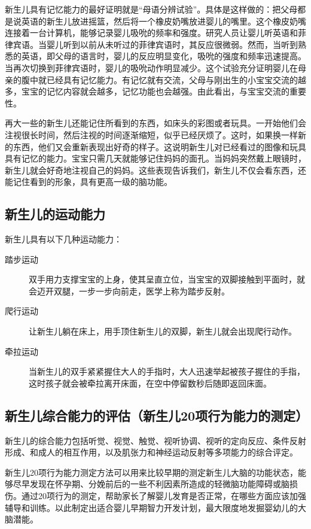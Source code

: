 新生儿具有记忆能力的最好证明就是``母语分辨试验''。具体是这样做的：把父母都是说英语的新生儿放进摇篮，然后将一个橡皮奶嘴放进婴儿的嘴里。这个橡皮奶嘴连接着一台计算机，能够记录婴儿吸吮的频率和强度。研究人员让婴儿听英语和菲律宾语。当婴儿听到以前从未听过的菲律宾语时，其反应很微弱。然而，当听到熟悉的英语，即父母的语言时，婴儿的反应明显变化，吸吮的强度和频率迅速提高。当再次切换到菲律宾语时，婴儿的吸吮动作明显减少。这个试验充分证明婴儿在母亲的腹中就已经具有记忆能力。有记忆就有交流，父母与刚出生的小宝宝交流的越多，宝宝的记忆内容就会越多，记忆功能也会越强。由此看出，与宝宝交流的重要性。

再大一些的新生儿还能记住所看到的东西，如床头的彩图或者玩具。一开始他们会注视很长时间，然后注视的时间逐渐缩短，似乎已经厌烦了。这时，如果换一样新的东西，他们又会重新表现出好奇的样子。这说明新生儿对已经看过的图像和玩具具有记忆的能力。宝宝只需几天就能够记住妈妈的面孔。当妈妈突然戴上眼镜时，新生儿就会好奇地注视自己的妈妈。这些表现告诉我们，新生儿不仅会看东西，还能记住看到的形象，具有更高一级的脑功能。


\subsection{新生儿的运动能力}%

新生儿具有以下几种运动能力：

\begin{description}
\item
[踏步运动]双手用力支撑宝宝的上身，使其呈直立位，当宝宝的双脚接触到平面时，就会迈开双腿，一步一步向前走，医学上称为踏步反射。
\item
[爬行运动]让新生儿躺在床上，用手顶住新生儿的双脚，新生儿就会出现爬行动作。
\item
[牵拉运动]当新生儿的双手紧紧握住大人的手指时，大人迅速举起被孩子握住的手指，这时孩子就会被牵拉离开床面，在空中停留数秒后随即返回床面。
\end{description}

\subsection{新生儿综合能力的评估（新生儿20项行为能力的测定）}

新生儿的综合能力包括听觉、视觉、触觉、视听协调、视听的定向反应、条件反射形成、和成人的相互作用，以及肌张力和神经运动反射等多项能力的综合评定。

新生儿20项行为能力测定方法可以用来比较早期的测定新生儿大脑的功能状态，能够尽早发现在怀孕期、分娩前后的一些不利因素所造成的轻微脑功能障碍或脑损伤。通过20项行为的测定，帮助家长了解婴儿发育是否正常，在哪些方面应该加强辅导和训练。以此制定出适合婴儿早期智力开发计划，最大限度地发掘婴幼儿的大脑潜能。
 
